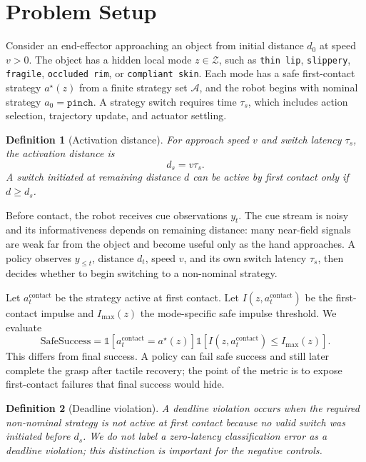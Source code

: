 \documentclass{article}
\newtheorem{definition}{Definition}
\begin{document}
\section{Problem Setup}

Consider an end-effector approaching an object from initial distance $d_0$ at speed $v>0$. The object has a hidden local mode $z \in \mathcal{Z}$, such as \texttt{thin lip}, \texttt{slippery}, \texttt{fragile}, \texttt{occluded rim}, or \texttt{compliant skin}. Each mode has a safe first-contact strategy $a^\star(z)$ from a finite strategy set $\mathcal{A}$, and the robot begins with nominal strategy $a_0=\texttt{pinch}$. A strategy switch requires time $\tau_s$, which includes action selection, trajectory update, and actuator settling.

\begin{definition}[Activation distance]
For approach speed $v$ and switch latency $\tau_s$, the activation distance is
\begin{equation}
d_s = v\tau_s .
\end{equation}
A switch initiated at remaining distance $d$ can be active by first contact only if $d \geq d_s$.
\end{definition}

Before contact, the robot receives cue observations $y_t$. The cue stream is noisy and its informativeness depends on remaining distance: many near-field signals are weak far from the object and become useful only as the hand approaches. A policy observes $y_{\leq t}$, distance $d_t$, speed $v$, and its own switch latency $\tau_s$, then decides whether to begin switching to a non-nominal strategy.

Let $a_t^{\mathrm{contact}}$ be the strategy active at first contact. Let $I(z,a_t^{\mathrm{contact}})$ be the first-contact impulse and $I_{\max}(z)$ the mode-specific safe impulse threshold. We evaluate
\begin{equation}
\mathrm{SafeSuccess} =
\mathbb{1}\left[a_t^{\mathrm{contact}} = a^\star(z)\right]
\mathbb{1}\left[I(z,a_t^{\mathrm{contact}}) \leq I_{\max}(z)\right].
\end{equation}
This differs from final success. A policy can fail safe success and still later complete the grasp after tactile recovery; the point of the metric is to expose first-contact failures that final success would hide.

\begin{definition}[Deadline violation]
A deadline violation occurs when the required non-nominal strategy is not active at first contact because no valid switch was initiated before $d_s$. We do not label a zero-latency classification error as a deadline violation; this distinction is important for the negative controls.
\end{definition}
\end{document}
